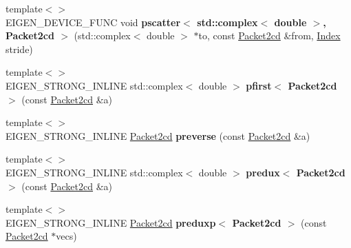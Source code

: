 \begin{DoxyCompactItemize}
\mbox{\label{namespace_eigen_1_1internal_a3b459f77ce250159ab6baeae1e66f39a}} 
{\footnotesize template$<$$>$ }\\E\+I\+G\+E\+N\+\_\+\+D\+E\+V\+I\+C\+E\+\_\+\+F\+U\+NC void {\bfseries pscatter$<$ std\+::complex$<$ double $>$, Packet2cd $>$} (std\+::complex$<$ double $>$ $\ast$to, const \hyperlink{struct_eigen_1_1internal_1_1_packet2cd}{Packet2cd} \&from, \hyperlink{namespace_eigen_a62e77e0933482dafde8fe197d9a2cfde}{Index} stride)
\item 
\mbox{\label{namespace_eigen_1_1internal_a4ab0f48eb27232fbfb9d0560eca0ac06}} 
{\footnotesize template$<$$>$ }\\E\+I\+G\+E\+N\+\_\+\+S\+T\+R\+O\+N\+G\+\_\+\+I\+N\+L\+I\+NE std\+::complex$<$ double $>$ {\bfseries pfirst$<$ Packet2cd $>$} (const \hyperlink{struct_eigen_1_1internal_1_1_packet2cd}{Packet2cd} \&a)
\item 
\mbox{\label{namespace_eigen_1_1internal_ad5277aa8198a1668fe9dd0313c818dec}} 
{\footnotesize template$<$$>$ }\\E\+I\+G\+E\+N\+\_\+\+S\+T\+R\+O\+N\+G\+\_\+\+I\+N\+L\+I\+NE \hyperlink{struct_eigen_1_1internal_1_1_packet2cd}{Packet2cd} {\bfseries preverse} (const \hyperlink{struct_eigen_1_1internal_1_1_packet2cd}{Packet2cd} \&a)
\item 
\mbox{\label{namespace_eigen_1_1internal_a00b54661b9c2fcf4f5612e264fd9c882}} 
{\footnotesize template$<$$>$ }\\E\+I\+G\+E\+N\+\_\+\+S\+T\+R\+O\+N\+G\+\_\+\+I\+N\+L\+I\+NE std\+::complex$<$ double $>$ {\bfseries predux$<$ Packet2cd $>$} (const \hyperlink{struct_eigen_1_1internal_1_1_packet2cd}{Packet2cd} \&a)
\item 
\mbox{\label{namespace_eigen_1_1internal_ace14e019013bd60a4aed54ac061a9531}} 
{\footnotesize template$<$$>$ }\\E\+I\+G\+E\+N\+\_\+\+S\+T\+R\+O\+N\+G\+\_\+\+I\+N\+L\+I\+NE \hyperlink{struct_eigen_1_1internal_1_1_packet2cd}{Packet2cd} {\bfseries preduxp$<$ Packet2cd $>$} (const \hyperlink{struct_eigen_1_1internal_1_1_packet2cd}{Packet2cd} $\ast$vecs)
\item 
\mbox{\label{namespace_eigen_1_1internal_a47b11d99bd00ce10faa693a36de2a0b4}} 

\end{DoxyCompactItemize}
